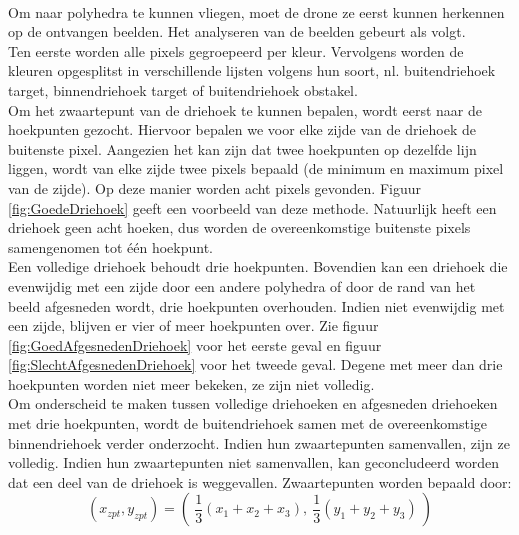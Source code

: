 \\

Om naar polyhedra te kunnen vliegen, moet de drone ze eerst kunnen herkennen op de ontvangen beelden. Het analyseren van de beelden gebeurt als volgt. 
\\
Ten eerste worden alle pixels gegroepeerd per kleur. Vervolgens worden de kleuren opgesplitst in verschillende lijsten volgens hun soort, nl. buitendriehoek target, binnendriehoek target of buitendriehoek obstakel. 
\\
Om het zwaartepunt van de driehoek te kunnen bepalen, wordt eerst naar de hoekpunten gezocht. Hiervoor bepalen we voor elke zijde van de driehoek de buitenste pixel. Aangezien het kan zijn dat twee hoekpunten op dezelfde lijn liggen, wordt van elke zijde twee pixels bepaald (de minimum en maximum pixel van de zijde). Op deze manier worden acht pixels gevonden. Figuur \ref{fig:GoedeDriehoek} geeft een voorbeeld van deze methode. Natuurlijk heeft een driehoek geen acht hoeken, dus worden de overeenkomstige buitenste pixels samengenomen tot één hoekpunt. 
\\
Een volledige driehoek behoudt drie hoekpunten. Bovendien kan een driehoek die evenwijdig met een zijde door een andere polyhedra of door de rand van het beeld afgesneden wordt, drie hoekpunten overhouden. Indien niet evenwijdig met een zijde, blijven er vier of meer hoekpunten over. Zie figuur \ref{fig:GoedAfgesnedenDriehoek} voor het eerste geval en figuur \ref{fig:SlechtAfgesnedenDriehoek} voor het tweede geval. Degene met meer dan drie hoekpunten worden niet meer bekeken, ze zijn niet volledig.
\\
Om onderscheid te maken tussen volledige driehoeken en afgesneden driehoeken met drie hoekpunten, wordt de buitendriehoek samen met de overeenkomstige binnendriehoek verder onderzocht. Indien hun zwaartepunten samenvallen, zijn ze volledig. Indien hun zwaartepunten niet samenvallen, kan geconcludeerd worden dat een deel van de driehoek is weggevallen. Zwaartepunten worden bepaald door: \begin{equation}
(x_{zpt},y_{zpt}) = ( \ \frac{1}{3}(x_1 + x_2 + x_3) , \ \frac{1}{3}(y_1 + y_2 + y_3) \ )
\end{equation}

